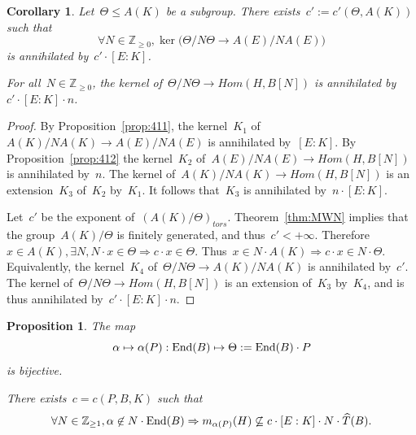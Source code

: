 \documentclass[12pt]{amsart}
\newtheorem{proposition}[theorem]{Proposition}
\newtheorem{corollary}[theorem]{Corollary}
\newcommand{\End}{{\rm End}}
\newcommand{\Z}{{\mathbb Z}}
\newcommand{\wh}{\widehat}
\begin{document}
\begin{corollary}\label{cor:613}
Let~$\Theta\leq A(K)$ be a subgroup. There exists~$c':=c'(\Theta,A(K))$ such that
\[
\forall N\in\Z_{\geq0},\ker\bigl(\Theta/N\Theta\to A(E)/NA(E)\bigr)
\]
is annihilated by~$c'\cdot [E:K]$. 


For all~$N\in\Z_{\geq0}$, the kernel of~$\Theta/N\Theta\to Hom(H,B[N])$ is annihilated by~$c'\cdot [E:K]\cdot n$.
\end{corollary}
\begin{proof} By Proposition~\ref{prop:411}, the kernel~$K_1$ of~$A(K)/NA(K)\to A(E)/NA(E)$ is annihilated by~$[E:K]$. By Proposition~\ref{prop:412} the kernel~$K_2$ of~$A(E)/NA(E)\to  Hom(H,B[N])$ is annihilated by~$n$. The kernel of~$A(K)/NA(K)\to  Hom(H,B[N])$ is an extension~$K_3$ of~$K_2$ by~$K_1$. It follows that~$K_3$ is annihilated by~$n\cdot [E:K]$.

Let~$c'$ be the exponent of~$(A(K)/\Theta)_{tors}$. Theorem~\ref{thm:MWN} implies that the group~$A(K)/\Theta$ is finitely generated, and thus~$c'<+\infty$. Therefore~$x\in A(K), \exists N, N\cdot x\in \Theta\Rightarrow c\cdot x\in \Theta$. Thus~$x\in N\cdot A(K)\Rightarrow c\cdot x\in N\cdot \Theta$. Equivalently, the kernel~$K_4$ of~$\Theta/N\Theta\to A(K)/NA(K)$ is annihilated by~$c'$. The kernel of~$\Theta/N\Theta\to Hom(H,B[N])$ is an extension of~$K_3$ by~$K_4$, and is thus annihilated by~$c'\cdot [E:K]\cdot n$.
\end{proof}
\begin{proposition}\label{prop:preliminaire}
The map
\begin{equation}\label{eq:100}
\alpha\mapsto\alpha(P):\End(B)\mapsto \Theta:=\End(B)\cdot P
\end{equation}
is bijective.

There exists~$c=c(P,B,K)$ such that
\begin{equation}\label{eq:0}
\forall N\in\Z_{\geq1}, \alpha\not\in N\cdot \End(B) \Rightarrow m_{\alpha(P)}(H)\not\subseteq c\cdot [E:K]\cdot N\cdot \wh{T}(B).
\end{equation}
\end{proposition}
\end{document}

